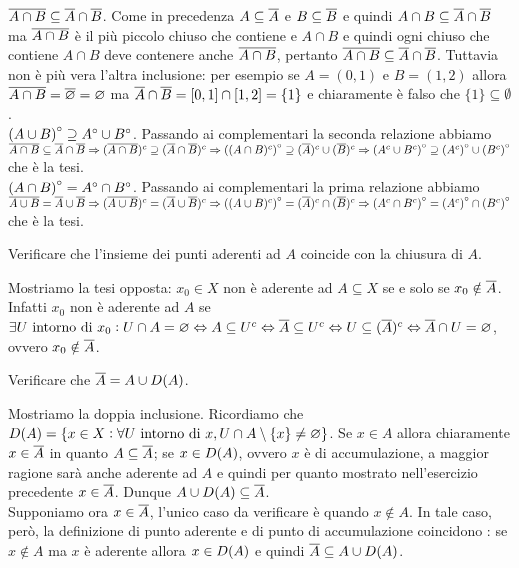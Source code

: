 $ \overline{A \cap B} \subseteq \overline{A} \cap \overline{B} $. Come in precedenza $ A \subseteq \overline{A} $ e $ B \subseteq \overline{B} $ e quindi $ A \cap B \subseteq \overline{A} \cap \overline{B} $ ma $ \overline{A \cap B} $ è il più piccolo chiuso che contiene e $ A \cap B $ e quindi ogni chiuso che contiene $ A \cap B $ deve contenere anche $ \overline{A \cap B} $, pertanto $ \overline{A \cap B} \subseteq \overline{A} \cap \overline{B} $. Tuttavia non è più vera l'altra inclusione: per esempio se $ A = (0, 1) $ e $ B = (1, 2) $ allora $ \overline{A \cap B} = \overline{\varnothing} = \varnothing $ ma $ \overline{A} \cap \overline{B} = [0, 1] \cap [1, 2] = \{1\} $ e chiaramente è falso che $ \{1\} \subseteq \emptyset $. \\

$ {(A \cup B)}^{\circ} \supseteq {A}^{\circ} \cup {B}^{\circ} $. Passando ai complementari la seconda relazione abbiamo $ \overline{A \cap B} \subseteq \overline{A} \cap \overline{B} \Rightarrow (\overline{A \cap B})^c \supseteq (\overline{A} \cap \overline{B})^c \Rightarrow {((A \cap B)^c)}^{\circ} \supseteq (\overline{A})^c \cup (\overline{B})^c \Rightarrow {(A^c \cup B^c)}^{\circ} \supseteq {(A^c)}^{\circ} \cup {(B^c)}^{\circ} $ che è la tesi. \\

$ {(A \cap B)}^{\circ} = {A}^{\circ} \cap {B}^{\circ} $. Passando ai complementari la prima relazione abbiamo $ \overline{A \cup B} = \overline{A} \cup \overline{B} \Rightarrow (\overline{A \cup B})^c = (\overline{A} \cup \overline{B})^c \Rightarrow {((A \cup B)^c)}^{\circ} = (\overline{A})^c \cap (\overline{B})^c \Rightarrow {(A^c \cap B^c)}^{\circ} = {(A^c)}^{\circ} \cap {(B^c)}^{\circ} $ che è la tesi.

\begin{es}
  Verificare che l'insieme dei punti aderenti ad $ A $ coincide con la chiusura di $ A $.
\end{es}
%
Mostriamo la tesi opposta: $ x_0 \in X $ non è aderente ad $ A \subseteq X $ se e solo se $ x_0 \notin \overline{A} $. Infatti $ x_0 $ non è aderente ad $ A $ se $ \exists U \text{ intorno di } x_0 : U \cap A = \varnothing \Leftrightarrow A \subseteq U^c \Leftrightarrow \overline{A} \subseteq U^c \Leftrightarrow U \subseteq (\overline{A})^c \Leftrightarrow \overline{A} \cap U = \varnothing $, ovvero $ x_0 \notin \overline{A} $.

\begin{es}
  Verificare che $ \overline{A} = A \cup D{(A)} $.
\end{es}
%
Mostriamo la doppia inclusione. Ricordiamo che $ D{(A)} = \{x \in X : \forall U \text{ intorno di } x, U \cap A \setminus \{x\} \neq \varnothing\} $. Se $ x \in A $ allora chiaramente $ x \in \overline{A} $ in quanto $ A \subseteq \overline{A} $; se $ x \in D{(A)} $, ovvero $ x $ è di accumulazione, a maggior ragione sarà anche aderente ad $ A $ e quindi per quanto mostrato nell'esercizio precedente $ x \in \overline{A} $. Dunque $ A \cup D{(A)} \subseteq \overline{A} $. \\
Supponiamo ora $ x \in \overline{A} $, l'unico caso da verificare è quando $ x \notin A $. In tale caso, però, la definizione di punto aderente e di punto di accumulazione coincidono : se $ x \notin A $ ma $ x $ è aderente allora $ x \in D{(A)} $ e quindi $ \overline{A} \subseteq A \cup D{(A)} $.

